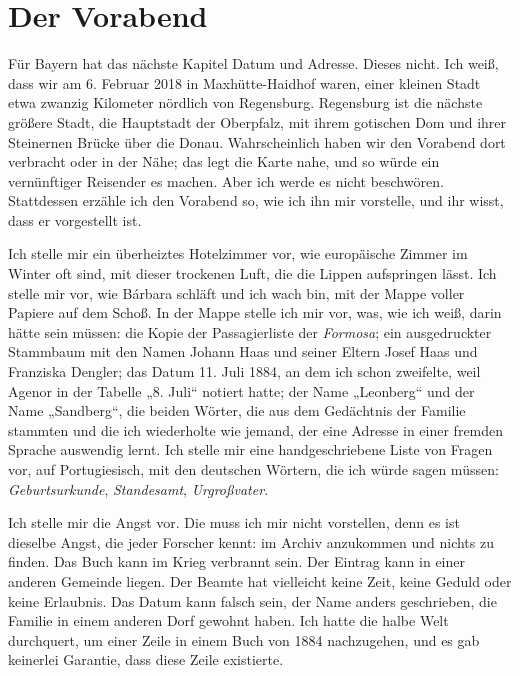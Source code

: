 \documentclass[
  ngerman,
  11pt,
  openany]{book}
\begin{document}
\section{Der Vorabend}\label{der-vorabend}

Für Bayern hat das nächste Kapitel Datum und Adresse. Dieses nicht. Ich
weiß, dass wir am 6. Februar 2018 in Maxhütte-Haidhof waren, einer
kleinen Stadt etwa zwanzig Kilometer nördlich von Regensburg. Regensburg
ist die nächste größere Stadt, die Hauptstadt der Oberpfalz, mit ihrem
gotischen Dom und ihrer Steinernen Brücke über die Donau. Wahrscheinlich
haben wir den Vorabend dort verbracht oder in der Nähe; das legt die
Karte nahe, und so würde ein vernünftiger Reisender es machen. Aber ich
werde es nicht beschwören. Stattdessen erzähle ich den Vorabend so, wie
ich ihn mir vorstelle, und ihr wisst, dass er vorgestellt ist.

Ich stelle mir ein überheiztes Hotelzimmer vor, wie europäische Zimmer
im Winter oft sind, mit dieser trockenen Luft, die die Lippen
aufspringen lässt. Ich stelle mir vor, wie Bárbara schläft und ich wach
bin, mit der Mappe voller Papiere auf dem Schoß. In der Mappe stelle ich
mir vor, was, wie ich weiß, darin hätte sein müssen: die Kopie der
Passagierliste der \emph{Formosa}; ein ausgedruckter Stammbaum mit den
Namen Johann Haas und seiner Eltern Josef Haas und Franziska Dengler;
das Datum 11. Juli 1884, an dem ich schon zweifelte, weil Agenor in der
Tabelle „8. Juli`` notiert hatte; der Name „Leonberg`` und der Name
„Sandberg``, die beiden Wörter, die aus dem Gedächtnis der Familie
stammten und die ich wiederholte wie jemand, der eine Adresse in einer
fremden Sprache auswendig lernt. Ich stelle mir eine handgeschriebene
Liste von Fragen vor, auf Portugiesisch, mit den deutschen Wörtern, die
ich würde sagen müssen: \emph{Geburtsurkunde}, \emph{Standesamt},
\emph{Urgroßvater}.

Ich stelle mir die Angst vor. Die muss ich mir nicht vorstellen, denn es
ist dieselbe Angst, die jeder Forscher kennt: im Archiv anzukommen und
nichts zu finden. Das Buch kann im Krieg verbrannt sein. Der Eintrag
kann in einer anderen Gemeinde liegen. Der Beamte hat vielleicht keine
Zeit, keine Geduld oder keine Erlaubnis. Das Datum kann falsch sein, der
Name anders geschrieben, die Familie in einem anderen Dorf gewohnt
haben. Ich hatte die halbe Welt durchquert, um einer Zeile in einem Buch
von 1884 nachzugehen, und es gab keinerlei Garantie, dass diese Zeile
existierte.
\end{document}
